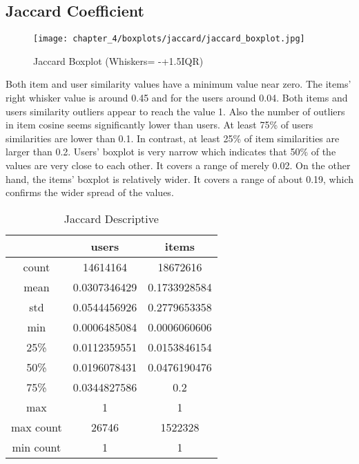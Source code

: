 \subsection{Jaccard Coefficient}
\begin{figure}[H]
\centering
\texttt{[image: chapter\_4/boxplots/jaccard/jaccard\_boxplot.jpg]}
\caption{Jaccard Boxplot (Whiskers= -+1.5IQR)}
\label{figure:jaccard_boxplot}
\end{figure}

Both item and user similarity values have a minimum value near zero. The items' right whisker value is
around 0.45 and for the users around 0.04. Both items and users similarity outliers appear to reach the value
1. Also the number of outliers in item cosine seems significantly lower than users. At least 75\% of
users similarities are lower than 0.1. In contrast, at least 25\% of item similarities are larger than 0.2.
Users' boxplot is very narrow which indicates that 50\% of the values are very close to each other. It
covers a range of merely 0.02. On the other hand, the items' boxplot is relatively wider. It covers a range of about 0.19,
which confirms the wider spread of the values.

\begin{table}[H]
\centering
\caption{Jaccard Descriptive}
\label{table:jaccard_descriptive}
\begin{tabular}{|c|c|c|}
\hline
          & \textbf{users} & \textbf{items} \\ \hline
count     & 14614164       & 18672616       \\ \hline
mean      & 0.0307346429   & 0.1733928584   \\ \hline
std       & 0.0544456926   & 0.2779653358   \\ \hline
min       & 0.0006485084   & 0.0006060606   \\ \hline
25\%      & 0.0112359551   & 0.0153846154   \\ \hline
50\%      & 0.0196078431   & 0.0476190476   \\ \hline
75\%      & 0.0344827586   & 0.2            \\ \hline
max       & 1              & 1              \\ \hline
max count & 26746          & 1522328        \\ \hline
min count & 1              & 1              \\ \hline
\end{tabular}
\end{table}

